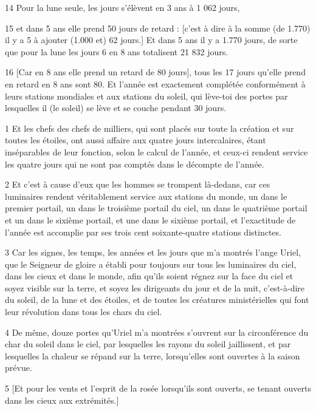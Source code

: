 \par 14 Pour la lune seule, les jours s'élèvent en 3 ans à 1 062 jours,
\par 15 et dans 5 ans elle prend 50 jours de retard : [c'est à dire à la somme (de 1.770) il y a 5 à ajouter (1.000 et) 62 jours.] Et dans 5 ans il y a 1.770 jours, de sorte que pour la lune les jours 6 en 8 ans totalisent 21 832 jours.
\par 16 [Car en 8 ans elle prend un retard de 80 jours], tous les 17 jours qu'elle prend en retard en 8 ans sont 80. Et l'année est exactement complétée conformément à leurs stations mondiales et aux stations du soleil, qui lève-toi des portes par lesquelles il (le soleil) se lève et se couche pendant 30 jours.


\par 1 Et les chefs des chefs de milliers, qui sont placés sur toute la création et sur toutes les étoiles, ont aussi affaire aux quatre jours intercalaires, étant inséparables de leur fonction, selon le calcul de l'année, et ceux-ci rendent service les quatre jours qui ne sont pas comptés dans le décompte de l'année.
\par 2 Et c'est à cause d'eux que les hommes se trompent là-dedans, car ces luminaires rendent véritablement service aux stations du monde, un dans le premier portail, un dans le troisième portail du ciel, un dans le quatrième portail et un dans le sixième portail, et une dans le sixième portail, et l'exactitude de l'année est accomplie par ses trois cent soixante-quatre stations distinctes.
\par 3 Car les signes, les temps, les années et les jours que m'a montrés l'ange Uriel, que le Seigneur de gloire a établi pour toujours sur tous les luminaires du ciel, dans les cieux et dans le monde, afin qu'ils soient régnez sur la face du ciel et soyez visible sur la terre, et soyez les dirigeants du jour et de la nuit, c'est-à-dire du soleil, de la lune et des étoiles, et de toutes les créatures ministérielles qui font leur révolution dans tous les chars du ciel.
\par 4 De même, douze portes qu'Uriel m'a montrées s'ouvrent sur la circonférence du char du soleil dans le ciel, par lesquelles les rayons du soleil jaillissent, et par lesquelles la chaleur se répand sur la terre, lorsqu'elles sont ouvertes à la saison prévue.
\par 5 [Et pour les vents et l'esprit de la rosée lorsqu'ils sont ouverts, se tenant ouverts dans les cieux aux extrémités.]
